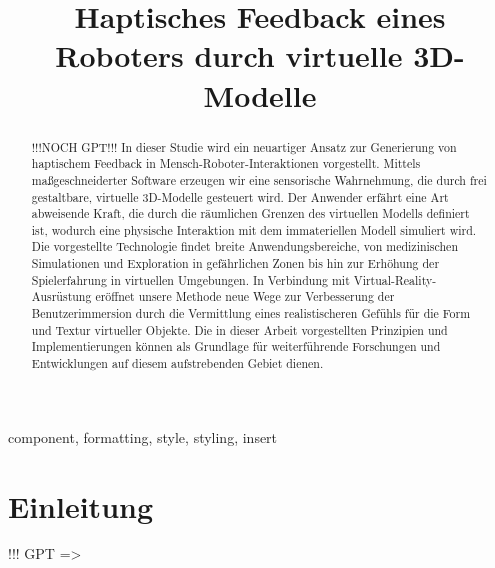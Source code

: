 \documentclass[conference]{IEEEtran}
\begin{document}
\title{Haptisches Feedback eines Roboters durch virtuelle 3D-Modelle}

\author{
    \and
}
\maketitle

\begin{abstract}
    !!!NOCH GPT!!!
    In dieser Studie wird ein neuartiger Ansatz zur Generierung von haptischem Feedback in 
    Mensch-Roboter-Interaktionen vorgestellt. Mittels maßgeschneiderter Software erzeugen wir 
    eine sensorische Wahrnehmung, die durch frei gestaltbare, virtuelle 3D-Modelle gesteuert wird. 
    Der Anwender erfährt eine Art abweisende Kraft, die durch die räumlichen Grenzen des 
    virtuellen Modells definiert ist, wodurch eine physische Interaktion mit dem immateriellen 
    Modell simuliert wird. Die vorgestellte Technologie findet breite Anwendungsbereiche, 
    von medizinischen Simulationen und Exploration in gefährlichen Zonen bis hin zur Erhöhung 
    der Spielerfahrung in virtuellen Umgebungen. In Verbindung mit Virtual-Reality-Ausrüstung 
    eröffnet unsere Methode neue Wege zur Verbesserung der Benutzerimmersion durch die 
    Vermittlung eines realistischeren Gefühls für die Form und Textur virtueller Objekte. 
    Die in dieser Arbeit vorgestellten Prinzipien und Implementierungen können als Grundlage 
    für weiterführende Forschungen und Entwicklungen auf diesem aufstrebenden Gebiet dienen.
\end{abstract}

\begin{IEEEkeywords}
    component, formatting, style, styling, insert
\end{IEEEkeywords}

\section{Einleitung}
!!! GPT =>
\end{document}
